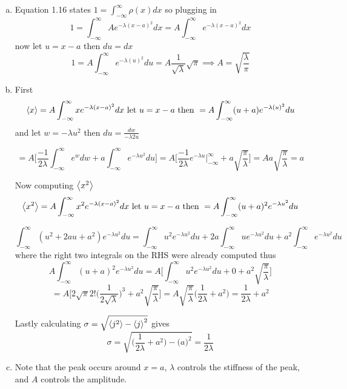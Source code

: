 \documentclass[12pt]{exam}
\begin{document}
\begin{solution}
    \begin{enumerate}[(a)]
        \item Equation 1.16 states $1 = \int^\infty_{-\infty} \rho(x)dx$ so plugging in 
        $$1 =\int^\infty_{-\infty} Ae^{-\lambda(x-a)^2}dx = A \int^\infty_{-\infty} e^{-\lambda(x-a)^2}dx$$ 
        now let $u = x-a $ then $du = dx$ 
        $$1 =A\int^\infty_{-\infty} e^{-\lambda(u)^2}du = A\frac{1}{\sqrt\lambda}\sqrt{\pi} \implies A = \sqrt{\frac{\lambda}{\pi}}$$

        \item First $$\expval{x} = A \int^\infty_{-\infty} xe^{-\lambda(x-a)^2} dx \text{ let $u = x-a$ then } = A \int^\infty_{-\infty} (u+a)e^{-\lambda(u)^2} du $$
        and let $w = -\lambda u^2$ then $du =\frac{dw}{-\lambda2u}$
        
        $$= A \bigg[\frac{-1}{2\lambda}\int^\infty_{-\infty} e^{w} dw + a\int^\infty_{-\infty} e^{-\lambda u^2} du\bigg] = A\bigg[ \frac{-1}{2\lambda}e^{-\lambda u}\big|^\infty_{-\infty} + a\sqrt{\frac{\pi}{\lambda}} \bigg] = Aa\sqrt{\frac{\pi}{\lambda}} = a$$

        Now computing $\expval{x^2}$  $$\expval{x^2} = A \int^\infty_{-\infty} x^2e^{-\lambda(x-a)^2} dx \text{ let $u = x-a$ then } = A \int^\infty_{-\infty} (u+a)^2e^{-\lambda u^2} du $$
        
        $$\int^\infty_{-\infty} (u^2 + 2au +a^2)e^{-\lambda u^2}du = \int^\infty_{-\infty} u^2 e^{-\lambda u^2}du + 2a\int^\infty_{-\infty}ue^{-\lambda u^2}du + a^2\int^\infty_{-\infty}e^{-\lambda u^2}du$$
        where the right two integrals on the RHS were already computed thus
        $$A\int^\infty_{-\infty} (u+a)^2e^{-\lambda u^2}du  = A\bigg[\int^\infty_{-\infty} u^2 e^{-\lambda u^2}du + 0 + a^2\sqrt{\frac{\pi}{\lambda}} \bigg]$$
        $$ = A\bigg[ 2\sqrt{\pi}2!\big(\frac{1}{2\sqrt{\lambda}}\big)^3 + a^2 \sqrt{\frac{\pi}{\lambda}} \bigg] = A\sqrt{\frac{\pi}{\lambda}} \bigg(\frac{1}{2\lambda} +a^2\bigg) = \frac{1}{2\lambda} +a^2$$

        Lastly calculating $\sigma = \sqrt{\expval{j^2}-\expval{j}^2}$ gives 
        $$\sigma = \sqrt{ \bigg(\frac{1}{2\lambda} +a^2\bigg) - \big(a\big)^2} = \frac{1}{2\lambda}$$

        \item Note that the peak occurs around $x = a$, $\lambda$ controls the stiffness of the peak, and $A$ controls the amplitude. 

        \noindent


\end{enumerate}
\end{solution}
\end{document}
